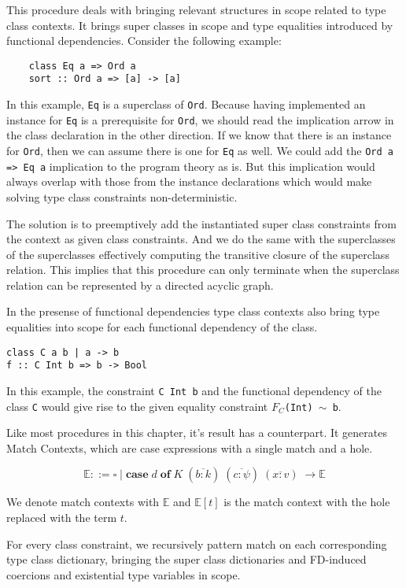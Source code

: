 This procedure deals with bringing relevant structures in scope related
to type class contexts. It brings super classes in scope and type equalities
introduced by functional dependencies. Consider the following example:
\begin{verbatim}
    class Eq a => Ord a
    sort :: Ord a => [a] -> [a]
\end{verbatim}
In this example, \texttt{Eq} is a superclass of \texttt{Ord}. Because having
implemented an instance for \texttt{Eq} is a prerequisite for \texttt{Ord}, we
should read the implication arrow in the class declaration in the other
direction. If we know that there is an instance for \texttt{Ord}, then we can
assume there is one for \texttt{Eq} as well. We could add the \texttt{Ord a =>
Eq a} implication to the program theory as is. But this implication would
always overlap with those from the instance declarations which would make
solving type class constraints non-deterministic.

The solution is to preemptively add the instantiated super class constraints
from the context as given class constraints. And we do the same with the
superclasses of the superclasses effectively computing the transitive closure of
the superclass relation. This implies that this procedure can only terminate
when the superclass relation can be represented by a directed acyclic graph.

In the presense of functional dependencies type class contexts also bring type
equalities into scope for each functional dependency of the class.
\begin{verbatim}
class C a b | a -> b
f :: C Int b => b -> Bool
\end{verbatim}
In this example, the constraint \texttt{C Int b} and the functional dependency
of the class \texttt{C} would give rise to the given equality constraint
\texttt{$F_C$(Int) $\sim$ b}.

Like most procedures in this chapter, it's result has a \systemfc
counterpart. It generates Match Contexts, which are case expressions with a
single match and a hole.
\begin{figure}[h]
$$
\mathbb{E} ::= \square \mid \textbf{case} \; d \; \textbf{of} \; K \;
(\overline{b : k}) \; (\overline{c : \psi}) \; (\overline{x : v}) \; \rightarrow
\mathbb{E}
$$
\end{figure}
We denote match contexts with $\mathbb{E}$ and $\mathbb{E}[t]$ is the match
context with the hole replaced with the term $t$.

For every class constraint, we recursively pattern match on each corresponding
type class dictionary, bringing the super class dictionaries and FD-induced
coercions and existential type variables in scope.

